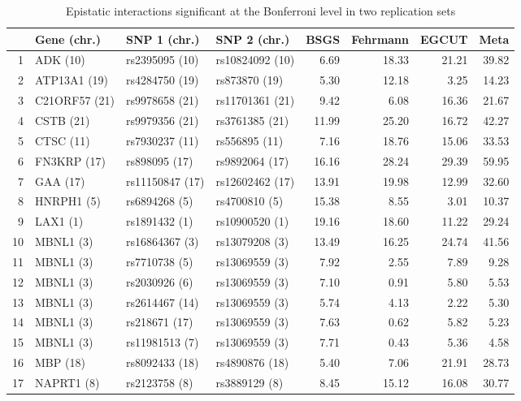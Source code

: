 \documentclass{article}
\begin{document}
\begin{table}[ht]
	\centering
	\begin{threeparttable}
		\caption{Epistatic interactions significant at the Bonferroni level in two replication sets}
		\label{tab:bonferroni}
		{\footnotesize
		\begin{tabular}{rlllrrrr}
  \hline
 & Gene (chr.) & SNP 1 (chr.) & SNP 2 (chr.) & BSGS\tnote{2} & Fehrmann\tnote{3} & EGCUT\tnote{3} & Meta\tnote{4} \\
  \hline
1 & ADK (10)  & rs2395095 (10)  & rs10824092 (10)  & 6.69\tnote{1} & 18.33\tnote{1} & 21.21\tnote{1} & 39.82\tnote{1} \\
  2 & ATP13A1 (19)  & rs4284750 (19)  & rs873870 (19)  & 5.30 & 12.18 & 3.25 & 14.23 \\
  3 & C21ORF57 (21)  & rs9978658 (21)  & rs11701361 (21)  & 9.42 & 6.08 & 16.36 & 21.67 \\
  4 & CSTB (21)  & rs9979356 (21)  & rs3761385 (21)  & 11.99 & 25.20 & 16.72 & 42.27 \\
  5 & CTSC (11)  & rs7930237 (11)  & rs556895 (11)  & 7.16 & 18.76 & 15.06 & 33.53 \\
  6 & FN3KRP (17)  & rs898095 (17)  & rs9892064 (17)  & 16.16 & 28.24 & 29.39 & 59.95 \\
  7 & GAA (17)  & rs11150847 (17)  & rs12602462 (17)  & 13.91 & 19.98 & 12.99 & 32.60 \\
  8 & HNRPH1 (5)  & rs6894268 (5)  & rs4700810 (5)  & 15.38 & 8.55 & 3.01 & 10.37 \\
  9 & LAX1 (1)  & rs1891432 (1)  & rs10900520 (1)  & 19.16 & 18.60 & 11.22 & 29.24 \\
  10 & MBNL1 (3)  & rs16864367 (3)  & rs13079208 (3)  & 13.49 & 16.25 & 24.74 & 41.56 \\
  11 & MBNL1 (3)  & rs7710738 (5)  & rs13069559 (3)  & 7.92 & 2.55 & 7.89 & 9.28 \\
  12 & MBNL1 (3)  & rs2030926 (6)  & rs13069559 (3)  & 7.10 & 0.91 & 5.80 & 5.53 \\
  13 & MBNL1 (3)  & rs2614467 (14)  & rs13069559 (3)  & 5.74 & 4.13 & 2.22 & 5.30 \\
  14 & MBNL1 (3)  & rs218671 (17)  & rs13069559 (3)  & 7.63 & 0.62 & 5.82 & 5.23 \\
  15 & MBNL1 (3)  & rs11981513 (7)  & rs13069559 (3)  & 7.71 & 0.43 & 5.36 & 4.58 \\
  16 & MBP (18)  & rs8092433 (18)  & rs4890876 (18)  & 5.40 & 7.06 & 21.91 & 28.73 \\
  17 & NAPRT1 (8)  & rs2123758 (8)  & rs3889129 (8)  & 8.45 & 15.12 & 16.08 & 30.77 \\

\end{tabular}}
\end{threeparttable}
\end{table}
\end{document}
